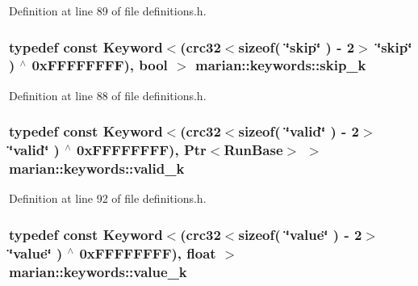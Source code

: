 Definition at line 89 of file definitions.\+h.

\subsubsection[{\texorpdfstring{skip\+\_\+k}{skip_k}}]{\setlength{\rightskip}{0pt plus 5cm}typedef const {\bf Keyword}$<$({\bf crc32}$<$sizeof( \char`\"{}skip\char`\"{} ) -\/ 2$>$ \char`\"{}{\bf skip}\char`\"{} ) $^\wedge$ 0x\+F\+F\+F\+F\+F\+F\+F\+F), bool $>$ marian\+::keywords\+::skip\+\_\+k}\hypertarget{namespacemarian_1_1keywords_ab3f25f4b72577d35dabc1a79a86b75fe}{}\label{namespacemarian_1_1keywords_ab3f25f4b72577d35dabc1a79a86b75fe}


Definition at line 88 of file definitions.\+h.

\subsubsection[{\texorpdfstring{valid\+\_\+k}{valid_k}}]{\setlength{\rightskip}{0pt plus 5cm}typedef const {\bf Keyword}$<$({\bf crc32}$<$sizeof( \char`\"{}valid\char`\"{} ) -\/ 2$>$ \char`\"{}{\bf valid}\char`\"{} ) $^\wedge$ 0x\+F\+F\+F\+F\+F\+F\+F\+F), Ptr$<$\+Run\+Base$>$ $>$ marian\+::keywords\+::valid\+\_\+k}\hypertarget{namespacemarian_1_1keywords_a330887765a1db7226363fd20201d8322}{}\label{namespacemarian_1_1keywords_a330887765a1db7226363fd20201d8322}


Definition at line 92 of file definitions.\+h.

\subsubsection[{\texorpdfstring{value\+\_\+k}{value_k}}]{\setlength{\rightskip}{0pt plus 5cm}typedef const {\bf Keyword}$<$({\bf crc32}$<$sizeof( \char`\"{}value\char`\"{} ) -\/ 2$>$ \char`\"{}{\bf value}\char`\"{} ) $^\wedge$ 0x\+F\+F\+F\+F\+F\+F\+F\+F), float $>$ marian\+::keywords\+::value\+\_\+k}\hypertarget{namespacemarian_1_1keywords_a1ad46beee725aee3d84c27fd6e75886d}{}\label{namespacemarian_1_1keywords_a1ad46beee725aee3d84c27fd6e75886d}


